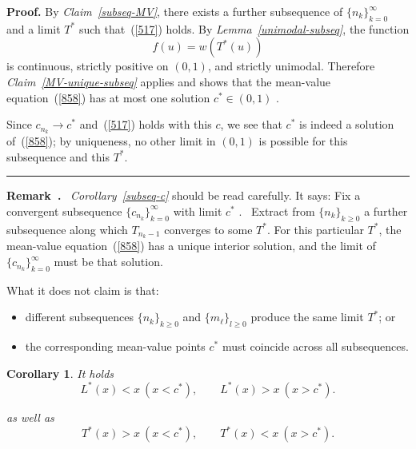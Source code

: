 \documentclass[onecolumn]{article}
\newtheorem{corollary}[theorem]{Corollary}
\newenvironment{remark}{  \refstepcounter{theorem}  \par\medskip\noindent\textbf{Remark~\thetheorem.}\rmfamily\ }{\par\medskip}
\newenvironment{proof}[1][Proof]{\noindent\textbf{#1.} }{\ \rule{0.5em}{0.5em}}
\begin{document}
\begin{proof}
By \textit{Claim~\ref{subseq-MV}}, there exists a further subsequence of $%
\{n_{k}\}_{k=0}^{\infty }$ and a limit $T^{\ast }$ such that~(\ref{517})
holds. By \textit{Lemma~\ref{unimodal-subseq}}, the function 
\begin{equation}
f(u)=w(T^{\ast }(u))  \label{859}
\end{equation}%
is continuous, strictly positive on $(0,1)$, and strictly unimodal.
Therefore \textit{Claim~\ref{MV-unique-subseq}} applies and shows that the
mean-value equation~(\ref{858}) has at most one solution $c^{\ast }\in (0,1)$%
.

Since $c_{n_{k}}\rightarrow c^{\ast }$ and~(\ref{517}) holds with this $c$,
we see that $c^{\ast }$ is indeed a solution of~(\ref{858}); by uniqueness,
no other limit in $(0,1)$ is possible for this subsequence and this $T^{\ast
}$. \medskip
\end{proof}

\begin{remark}
\textit{Corollary~\ref{subseq-c}} should be read carefully. It says: Fix a
convergent subsequence $\{c_{n_{k}}\}_{k=0}^{\infty }$ with limit $c^{\ast }$%
. \ Extract from $\{n_{k}\}_{k\geq 0}$ a further subsequence along which $%
T_{n_{k}-1}$ converges to some $T^{\ast }$. For this particular $T^{\ast }$,
the mean-value equation~(\ref{858}) has a unique interior solution, and the
limit of $\{c_{n_{k}}\}_{k=0}^{\infty }$ must be that solution.

What it does not claim is that:

\begin{itemize}
\item different subsequences $\{n_{k}\}_{k\geq 0}$ and $\{m_{\ell }\}_{l\geq
0}$ produce the same limit $T^{\ast }$; or

\item the corresponding mean-value points $c^{\ast }$ must coincide across
all subsequences.
\end{itemize}
\end{remark}

\begin{corollary}
\label{cross-limit} It holds%
\begin{equation*}
L^{\ast }(x)<x\ (x<c^{\ast }),\qquad L^{\ast }(x)>x\ (x>c^{\ast }).
\end{equation*}

as well as 
\begin{equation*}
T^{\ast }(x)>x\ (x<c^{\ast }),\qquad T^{\ast }(x)<x\ (x>c^{\ast }).
\end{equation*}
\end{corollary}
\end{document}

